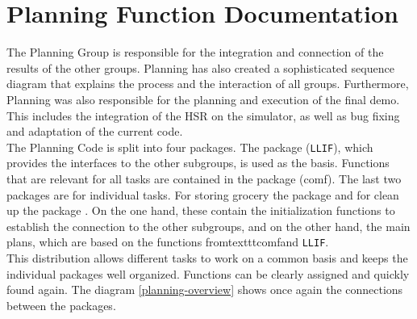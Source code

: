 \documentclass[main.tex]{subfiles}
\begin{document}
    \begingroup

    \renewcommand{\cleardoublepage}{}

    \renewcommand{\clearpage}{}
    
    \newpage

    \chapter{Planning Function Documentation}

        
        The Planning Group is responsible for the integration and connection of the results of the other groups. Planning has also created a sophisticated sequence diagram that explains the process and the interaction of all groups.
        Furthermore, Planning was also responsible for the planning and execution of the final demo. This includes the integration of the HSR on the simulator, as well as bug fixing and adaptation of the current code. \\
            
            The Planning Code is split into four packages. The package  (\texttt{LLIF}), which provides the interfaces to the other subgroups, is used as the basis. Functions that are relevant for all tasks are contained in the package  (comf). The last two packages are for individual tasks. For storing grocery the package  and for clean up the package . On the one hand, these contain the initialization functions to establish the connection to the other subgroups, and on the other hand, the main plans, which are based on the functions fromtexttt{comf}and \texttt{LLIF}. \\
            This distribution allows different tasks to work on a common basis and keeps the individual packages well organized. Functions can be clearly assigned and quickly found again. The diagram \ref{planning-overview} shows once again the connections between the packages.
\end{document}
